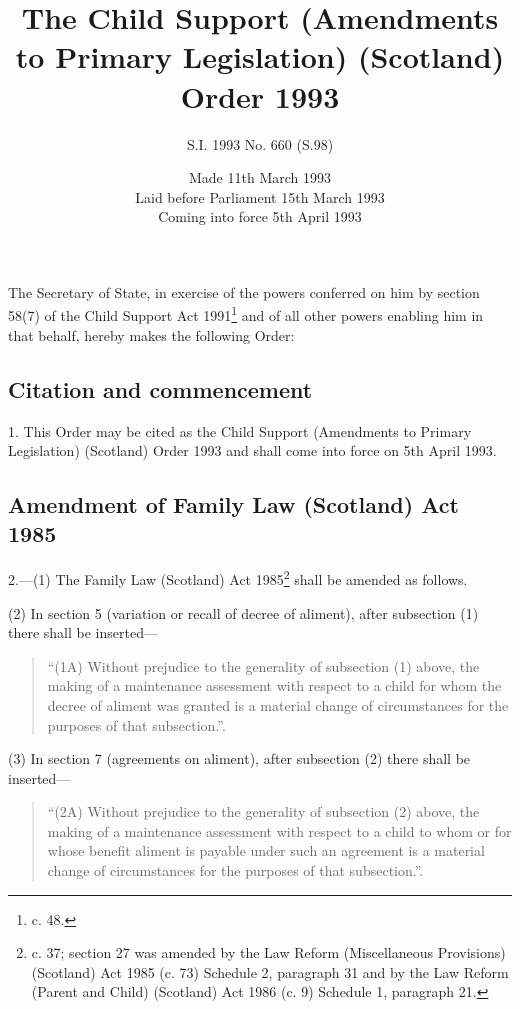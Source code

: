 \documentclass[a4paper]{article}
\title{The Child Support (Amendments to Primary Legislation) (Scotland) Order 1993}
\author{S.I. 1993 No. 660 (S.98)}
\date{Made 11th March 1993\\Laid before Parliament 15th March 1993\\Coming into force 5th April 1993}
\begin{document}
\maketitle

\noindent
The Secretary of State, in exercise of the powers conferred on him by section 58(7) of the Child Support Act 1991\footnote{ c. 48.} and of all other powers enabling him in that behalf, hereby makes the following Order:

{\sloppy

\tableofcontents

}

\setcounter{secnumdepth}{-2}

\subsection[1. Citation and commencement]{Citation and commencement}

1.  This Order may be cited as the Child Support (Amendments to Primary Legislation) (Scotland) Order 1993 and shall come into force on 5th April 1993.

\subsection[2. Amendment of Family Law (Scotland) Act 1985]{Amendment of Family Law (Scotland) Act 1985}

2.—(1) The Family Law (Scotland) Act 1985\footnote{ c. 37; section 27 was amended by the Law Reform (Miscellaneous Provisions) (Scotland) Act 1985 (c. 73) Schedule 2, paragraph 31 and by the Law Reform (Parent and Child) (Scotland) Act 1986 (c. 9) Schedule 1, paragraph 21.} shall be amended as follows.

(2) In section 5 (variation or recall of decree of aliment), after subsection (1) there shall be inserted—
\begin{quotation}
“(1A) Without prejudice to the generality of subsection (1) above, the making of a maintenance assessment with respect to a child for whom the decree of aliment was granted is a material change of circumstances for the purposes of that subsection.”.
\end{quotation}

(3) In section 7 (agreements on aliment), after subsection (2) there shall be inserted—
\begin{quotation}
“(2A) Without prejudice to the generality of subsection (2) above, the making of a maintenance assessment with respect to a child to whom or for whose benefit aliment is payable under such an agreement is a material change of circumstances for the purposes of that subsection.”.
\end{quotation}
\end{document}
